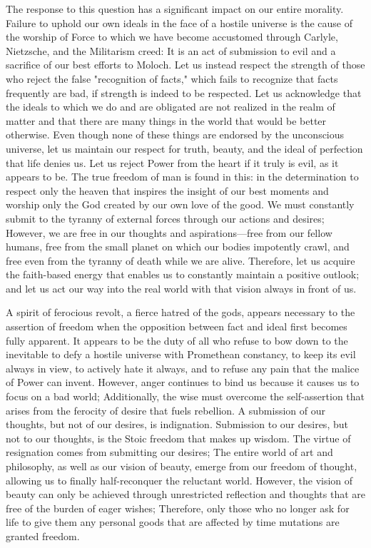 \documentclass[a4paper,12pt]{book}[2004/02/16]
\theoremstyle{ilemma}
\theoremstyle{itheorem}
\theoremstyle{iother}
\theoremstyle{icorollary}
\theoremstyle{numcorollary}
\theoremstyle{idefinition}
\begin{document}
The response to this question has a significant impact on our entire morality. Failure to uphold our own ideals in the face of a hostile universe is the cause of the worship of Force to which we have become accustomed through Carlyle, Nietzsche, and the Militarism creed: It is an act of submission to evil and a sacrifice of our best efforts to Moloch. Let us instead respect the strength of those who reject the false "recognition of facts," which fails to recognize that facts frequently are bad, if strength is indeed to be respected. Let us acknowledge that the ideals to which we do and are obligated are not realized in the realm of matter and that there are many things in the world that would be better otherwise. Even though none of these things are endorsed by the unconscious universe, let us maintain our respect for truth, beauty, and the ideal of perfection that life denies us. Let us reject Power from the heart if it truly is evil, as it appears to be. The true freedom of man is found in this: in the determination to respect only the heaven that inspires the insight of our best moments and worship only the God created by our own love of the good. We must constantly submit to the tyranny of external forces through our actions and desires; However, we are free in our thoughts and aspirations—free from our fellow humans, free from the small planet on which our bodies impotently crawl, and free even from the tyranny of death while we are alive. Therefore, let us acquire the faith-based energy that enables us to constantly maintain a positive outlook; and let us act our way into the real world with that vision always in front of us.

A spirit of ferocious revolt, a fierce hatred of the gods, appears necessary to the assertion of freedom when the opposition between fact and ideal first becomes fully apparent. It appears to be the duty of all who refuse to bow down to the inevitable to defy a hostile universe with Promethean constancy, to keep its evil always in view, to actively hate it always, and to refuse any pain that the malice of Power can invent. However, anger continues to bind us because it causes us to focus on a bad world; Additionally, the wise must overcome the self-assertion that arises from the ferocity of desire that fuels rebellion. A submission of our thoughts, but not of our desires, is indignation. Submission to our desires, but not to our thoughts, is the Stoic freedom that makes up wisdom. The virtue of resignation comes from submitting our desires; The entire world of art and philosophy, as well as our vision of beauty, emerge from our freedom of thought, allowing us to finally half-reconquer the reluctant world. However, the vision of beauty can only be achieved through unrestricted reflection and thoughts that are free of the burden of eager wishes; Therefore, only those who no longer ask for life to give them any personal goods that are affected by time mutations are granted freedom.
\end{document}
